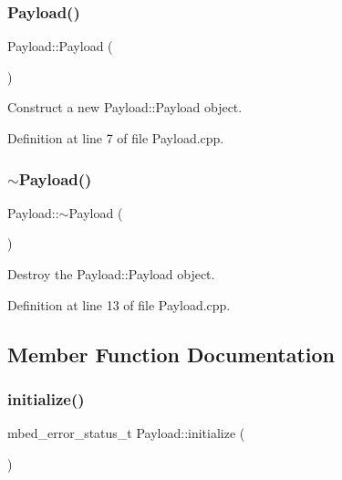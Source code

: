 \subsubsection{\texorpdfstring{Payload()}{Payload()}}
{\footnotesize\ttfamily Payload\+::\+Payload (\begin{DoxyParamCaption}{ }\end{DoxyParamCaption})}



Construct a new Payload\+::\+Payload object. 



Definition at line 7 of file Payload.\+cpp.

\mbox{\label{class_payload_ae391ae4ea0e160ee9dd58c559bbf74f7}} 
\subsubsection{\texorpdfstring{$\sim$Payload()}{~Payload()}}
{\footnotesize\ttfamily Payload\+::$\sim$\+Payload (\begin{DoxyParamCaption}{ }\end{DoxyParamCaption})}



Destroy the Payload\+::\+Payload object. 



Definition at line 13 of file Payload.\+cpp.



\subsection{Member Function Documentation}
\mbox{\label{class_payload_aa55a2da734e6950391d73b0837bbd3b9}} 
\subsubsection{\texorpdfstring{initialize()}{initialize()}}
{\footnotesize\ttfamily mbed\+\_\+error\+\_\+status\+\_\+t Payload\+::initialize (\begin{DoxyParamCaption}{ }\end{DoxyParamCaption})\hspace{0.3cm}{\ttfamily [virtual]}}



